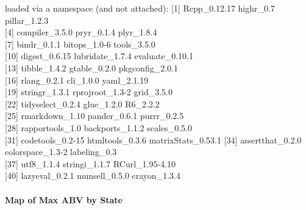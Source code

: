 \documentclass[]{article}
\let\oldparagraph\paragraph
\renewcommand{\paragraph}[1]{\oldparagraph{#1}\mbox{}}
\begin{document}
loaded via a namespace (and not attached): {[}1{]} Rcpp\_0.12.17
highr\_0.7 pillar\_1.2.3\\
{[}4{]} compiler\_3.5.0 pryr\_0.1.4 plyr\_1.8.4\\
{[}7{]} bindr\_0.1.1 bitops\_1.0-6 tools\_3.5.0\\
{[}10{]} digest\_0.6.15 lubridate\_1.7.4 evaluate\_0.10.1\\
{[}13{]} tibble\_1.4.2 gtable\_0.2.0 pkgconfig\_2.0.1\\
{[}16{]} rlang\_0.2.1 cli\_1.0.0 yaml\_2.1.19\\
{[}19{]} stringr\_1.3.1 rprojroot\_1.3-2 grid\_3.5.0\\
{[}22{]} tidyselect\_0.2.4 glue\_1.2.0 R6\_2.2.2\\
{[}25{]} rmarkdown\_1.10 pander\_0.6.1 purrr\_0.2.5\\
{[}28{]} rapportools\_1.0 backports\_1.1.2 scales\_0.5.0\\
{[}31{]} codetools\_0.2-15 htmltools\_0.3.6 matrixStats\_0.53.1 {[}34{]}
assertthat\_0.2.0 colorspace\_1.3-2 labeling\_0.3\\
{[}37{]} utf8\_1.1.4 stringi\_1.1.7 RCurl\_1.95-4.10\\
{[}40{]} lazyeval\_0.2.1 munsell\_0.5.0 crayon\_1.3.4

\paragraph{Map of Max ABV by State}\label{map-of-max-abv-by-state}
\end{document}
